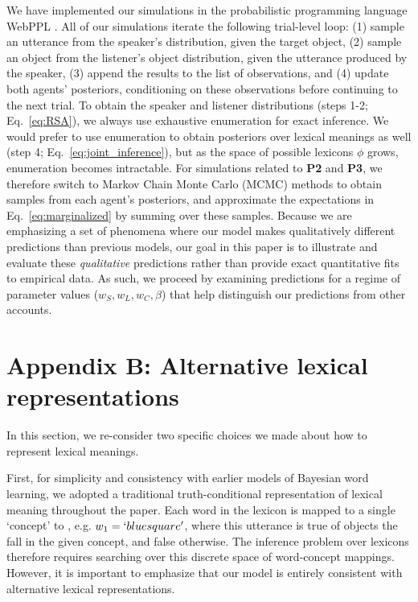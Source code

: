 \documentclass[10pt, man, floatsintext]{apa7}
\begin{document}
We have implemented our simulations in the probabilistic programming language WebPPL \cite{GoodmanStuhlmuller14_DIPPL}.
All of our simulations iterate the following trial-level loop: (1) sample an utterance from the speaker's distribution, given the target object, (2) sample an object from the listener's object distribution, given the utterance produced by the speaker, (3) append the results to the list of observations, and (4) update both agents' posteriors, conditioning on these observations before continuing to the next trial.
To obtain the speaker and listener distributions (steps 1-2; Eq.~\ref{eq:RSA}), we always use exhaustive enumeration for exact inference.
We would prefer to use enumeration to obtain posteriors over lexical meanings as well (step 4; Eq.~\ref{eq:joint_inference}), but as the space of possible lexicons $\phi$ grows, enumeration becomes intractable.
For simulations related to \textbf{P2} and \textbf{P3}, we therefore switch to Markov Chain Monte Carlo (MCMC) methods to obtain samples from each agent's posteriors, and approximate the expectations in Eq.~\ref{eq:marginalized} by summing over these samples. 
Because we are emphasizing a set of phenomena where our model makes qualitatively different predictions than previous models, our goal in this paper is to illustrate and evaluate these \emph{qualitative} predictions rather than provide exact quantitative fits to empirical data.
As such, we proceed by examining predictions for a regime of parameter values ($w_S, w_L, w_C,\beta$) that help distinguish our predictions from other accounts.

\section{Appendix B: Alternative lexical representations}

In this section, we re-consider two specific choices we made about how to represent lexical meanings.

First, for simplicity and consistency with earlier models of Bayesian word learning, we adopted a traditional truth-conditional representation of lexical meaning throughout the paper. 
Each word in the lexicon is mapped to a single `concept' to , e.g. $w_1 = `blue square'$, where this utterance is true of objects the fall in the given concept, and false otherwise. 
The inference problem over lexicons therefore requires searching over this discrete space of word-concept mappings. 
However, it is important to emphasize that our model is entirely consistent with alternative lexical representations.
\end{document}
